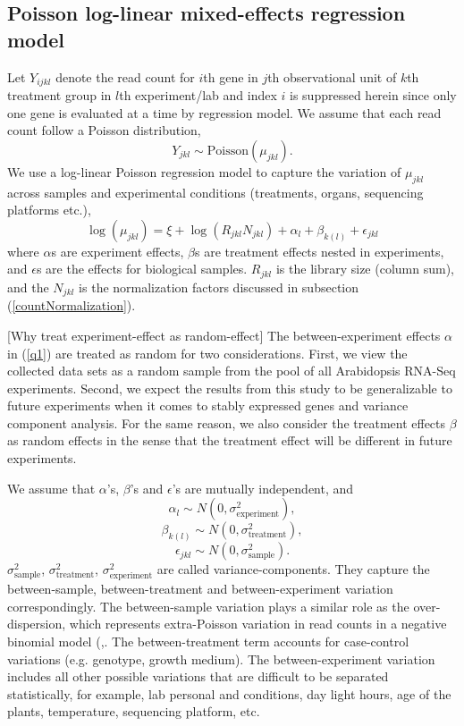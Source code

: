 \documentclass[11pt, a4paper]{article}
\begin{document}
\subsection{Poisson log-linear mixed-effects regression model}\label{OurMethod} 


Let $Y_{ijkl}$ denote the read count for $i$th gene
in $j$th observational unit of $k$th treatment group in $l$th experiment/lab
and index $i$ is suppressed herein since only one gene is evaluated at a time
by regression model. We assume that each read count follow a Poisson
distribution,  
\[Y_{jkl}\sim \text{Poisson}(\mu_{jkl}).\] 
We use a log-linear Poisson regression model to capture 
the variation of $\mu_{jkl}$ across samples and experimental conditions (treatments,
organs, sequencing platforms etc.),
\begin{equation}\label{q1}
    \log( \mu_{jkl}) = \xi + \log(R_{jkl}N_{jkl})+ \alpha_l + \beta_{k(l)} + \epsilon_{jkl} 
\end{equation}
where $\alpha$s are experiment effects,  $\beta$s are treatment effects
nested in experiments, and $\epsilon$s are the effects for biological samples. 
$R_{jkl}$ is the library size (column sum), and the $N_{jkl}$ is the normalization factors discussed in
subsection (\ref{countNormalization}).

[Why treat experiment-effect as random-effect] The between-experiment effects $\alpha$ in (\ref{q1}) are treated as random for two considerations. First, we view the collected data sets as a random sample from the pool of all Arabidopsis RNA-Seq experiments. Second, we expect the results from this study to be generalizable to future experiments when it comes to stably expressed genes and variance component analysis.
For the same reason, we also consider the treatment effects $\beta$ as random effects
in the sense that the treatment effect will be different in future experiments.

We assume that $\alpha$'s, $\beta$'s and $\epsilon$'s are mutually independent, and  
  \[\alpha_l\sim N(0, \sigma^2_{\text{experiment}}),\] 
  \[\beta_{k(l)}\sim N(0, \sigma^2_{\text{treatment}}),\]
   \[\epsilon_{jkl}\sim N(0, \sigma_{\text{sample}}^2).\]
$\sigma_{\text{sample}}^2$, $\sigma_{\text{treatment}}^2$, $\sigma_{\text{experiment}}^2$ are called variance-components. They capture the
between-sample, between-treatment and between-experiment variation
correspondingly. The between-sample variation plays a similar role as the over-dispersion, which  represents extra-Poisson variation in read counts in a negative binomial model (\cite{anders2010differential},\cite{di2011nbp}.  The between-treatment term accounts for case-control variations (e.g. genotype, growth medium). 
The between-experiment variation includes all other possible variations that are difficult to be separated statistically, for example, lab personal and conditions, day light hours, age of the plants, temperature, sequencing platform, etc.
\end{document}
